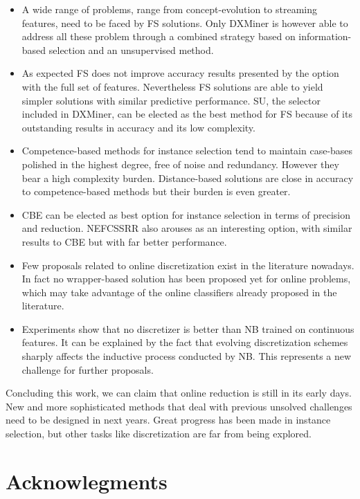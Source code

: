 \documentclass[preprint,12pt]{elsarticle}
\begin{document}
\begin{itemize}

	\item A wide range of problems, range from concept-evolution to streaming features, need to be faced by FS solutions. Only DXMiner is however able to address all these problem through a combined strategy based on information-based selection and an unsupervised method.
	\item As expected FS does not improve accuracy results presented by the option with the full set of features. Nevertheless FS solutions are able to yield simpler solutions with similar predictive performance. SU, the selector included in DXMiner, can be elected as the best method for FS because of its outstanding results in accuracy and its low complexity.
	\item Competence-based methods for instance selection tend to maintain case-bases polished in the highest degree, free of noise and redundancy. However they bear a high complexity burden. Distance-based solutions are close in accuracy to competence-based methods but their burden is even greater.
	\item CBE can be elected as best option for instance selection in terms of precision and reduction. NEFCSSRR also arouses as an interesting option, with similar results to CBE but with far better performance.
	\item Few proposals related to online discretization exist in the literature nowadays. In fact no wrapper-based solution has been proposed yet for online problems, which may take advantage of the online classifiers already proposed in the literature.
	\item Experiments show that no discretizer is better than NB trained on continuous features. It can be explained by the fact that evolving discretization schemes sharply affects the inductive process conducted by NB. This represents a new challenge for further proposals.	
\end{itemize}

Concluding this work, we can claim that online reduction is still in its early days. New and more sophisticated methods that deal with previous unsolved challenges need to be designed in next years. Great progress has been made in instance selection, but other tasks like discretization are far from being explored.

\section*{Acknowlegments}
\end{document}
